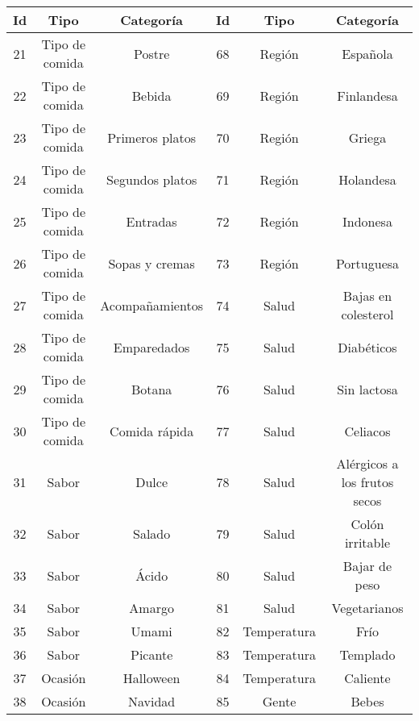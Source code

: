   \begin{table}
    \begin{center}
      \begin{tabular}{ | c | c | c | c | c | c |}
        \toprule
        Id & Tipo & Categoría & Id & Tipo & Categoría\\
        \midrule
        21 & Tipo de comida & Postre  & 68 & Región   & Española \\
        \midrule
        22 & Tipo de comida & Bebida  & 69 & Región   & Finlandesa \\
        \midrule
        23 & Tipo de comida & Primeros platos  & 70 & Región   & Griega \\
        \midrule
        24 & Tipo de comida & Segundos platos  & 71 & Región   & Holandesa \\
        \midrule
        25 & Tipo de comida & Entradas  & 72 & Región   & Indonesa \\
        \midrule
        26 & Tipo de comida & Sopas y cremas  & 73 & Región   & Portuguesa \\
        \midrule
        27 & Tipo de comida & Acompañamientos  & 74 & Salud   & Bajas en colesterol \\
        \midrule
        28 & Tipo de comida & Emparedados  & 75 & Salud   & Diabéticos \\
        \midrule
        29 & Tipo de comida & Botana  & 76 & Salud   & Sin lactosa \\
        \midrule
        30 & Tipo de comida & Comida rápida  & 77 & Salud   & Celiacos \\
        \midrule
        31 & Sabor & Dulce  & 78 & Salud   & Alérgicos a los frutos secos \\
        \midrule
        32 & Sabor & Salado  & 79 & Salud   & Colón irritable \\
        \midrule
        33 & Sabor & Ácido  & 80 & Salud   & Bajar de peso \\
        \midrule
        34 & Sabor & Amargo  & 81 & Salud   & Vegetarianos \\
        \midrule
        35 & Sabor & Umami  & 82 & Temperatura & Frío \\
        \midrule
        36 & Sabor & Picante  & 83 & Temperatura & Templado \\
        \midrule
        37 & Ocasión & Halloween  & 84 & Temperatura & Caliente \\
        \midrule
        38 & Ocasión & Navidad  & 85 & Gente & Bebes \\
        \midrule

\end{tabular}
\end{center}
\end{table}
